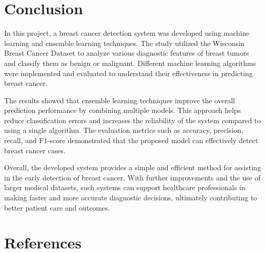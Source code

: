 \documentclass[12pt]{article}
\begin{document}
\newpage
\section{Conclusion}

In this project, a breast cancer detection system was developed using machine learning and ensemble learning techniques. The study utilized the Wisconsin Breast Cancer Dataset to analyze various diagnostic features of breast tumors and classify them as benign or malignant. Different machine learning algorithms were implemented and evaluated to understand their effectiveness in predicting breast cancer.

The results showed that ensemble learning techniques improve the overall prediction performance by combining multiple models. This approach helps reduce classification errors and increases the reliability of the system compared to using a single algorithm. The evaluation metrics such as accuracy, precision, recall, and F1-score demonstrated that the proposed model can effectively detect breast cancer cases.

Overall, the developed system provides a simple and efficient method for assisting in the early detection of breast cancer. With further improvements and the use of larger medical datasets, such systems can support healthcare professionals in making faster and more accurate diagnostic decisions, ultimately contributing to better patient care and outcomes.

\newpage
\section{References}
\end{document}
